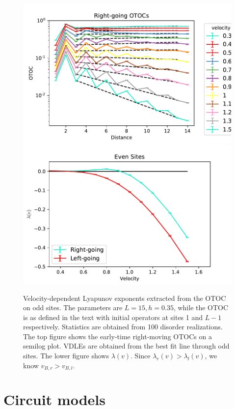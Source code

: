\documentclass[aps,prx,reprint,superscriptaddress, longbibliography]{revtex4-1}
\begin{document}
\begin{figure}
	\includegraphics[width=\columnwidth]{VDLEfromOTOCs}
	\includegraphics[width=\columnwidth]{vdle}
	\caption{Velocity-dependent Lyapunov exponents extracted from the OTOC on odd sites. The parameters are $L=15, h=0.35$, while the OTOC is as defined in the text with initial operators at sites 1 and $L-1$ respectively. Statistics are obtained from 100 disorder realizations. The top figure shows the early-time right-moving OTOCs on a semilog plot. VDLEs are obtained from the best fit line through odd sites. The lower figure shows $\lambda(v)$. Since $\lambda_r(v)>\lambda_l(v)$, we know $v_{B,r}>v_{B,l}$.}
	\label{fig:vdle}
\end{figure}

\section{Circuit models} \label{sec:circ}
\end{document}
